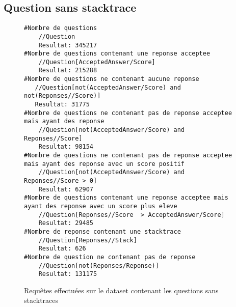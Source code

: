 \subsection{Question sans stacktrace}
\begin{figure}
\begin{lstlisting}
#Nombre de questions
    //Question
    Resultat: 345217
#Nombre de questions contenant une reponse acceptee
    //Question[AcceptedAnswer/Score]
    Resultat: 215288
#Nombre de questions ne contenant aucune reponse
   //Question[not(AcceptedAnswer/Score) and not(Reponses//Score)]
   Resultat: 31775
#Nombre de questions ne contenant pas de reponse acceptee mais ayant des reponse
    //Question[not(AcceptedAnswer/Score) and Reponses//Score]
    Resultat: 98154
#Nombre de questions ne contenant pas de reponse acceptee mais ayant des reponse avec un score positif
    //Question[not(AcceptedAnswer/Score) and Reponses//Score > 0] 
    Resultat: 62907
#Nombre de questions contenant une reponse acceptee mais ayant des reponse avec un score plus eleve
    //Question[Reponses//Score  > AcceptedAnswer/Score]
    Resultat: 29485
#Nombre de reponse contenant une stacktrace
    //Question[Reponses//Stack]
    Resultat: 626
#Nombre de question ne contenant pas de reponse
    //Question[not(Reponses/Reponse)]
    Resultat: 131175
\end{lstlisting}
\caption{Requêtes effectuées sur le dataset contenant les questions sans stacktraces}
\label{code:resultatSansStack}
\end{figure}